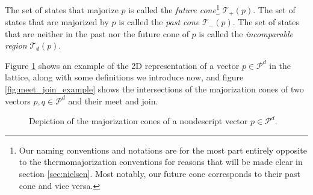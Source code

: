 \begin{definition} \label{def:majorization_cones}
    The set of states that majorize $p$ is called the \textit{future cone}\footnote{Our naming conventions and notations are for the most part entirely opposite to the thermomajorization conventions for reasons that will be made clear in section \ref{sec:nielsen}. Most notably, our future cone corresponds to their past cone and vice versa.}  $\mathcal{T}_+ (p)$. The set of states that are majorized by $p$ is called the \textit{past cone} $\mathcal{T}_- (p)$. The set of states that are neither in the past nor the future cone of $p$ is called the \textit{incomparable region} $\mathcal{T}_\emptyset (p)$.
\end{definition}

Figure \ref{fig:maj_cones_example} shows an example of the 2D representation of a vector $p \in \mathcal{P}^d$ in the lattice, along with some definitions we introduce now, and figure \ref{fig:meet_join_example} shows the intersections of the majorization cones of two vectors $p, q \in \mathcal{P}^d$ and their meet and join.

\begin{figure}[h!]
    \centering
    \caption{Depiction of the majorization cones of a nondescript vector $p \in \mathcal{P}^d$.}
    \label{fig:maj_cones_example}
\end{figure}

